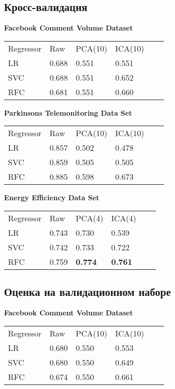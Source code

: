 \documentclass[runningheads]{llncs}
\begin{document}
\subsection{Кросс-валидация}
\textbf{Facebook Comment Volume Dataset}

\begin{table}[H]
\begin{tabular}{llllll}
Regressor & Raw     & PCA(10)   & ICA(10) \\
LR    & 0.688  & 0.551    & 0.551 \\
SVC   & 0.688  & 0.551    & 0.652 \\
RFC   & 0.681  & 0.551    & 0.660
\end{tabular}
\end{table}

\textbf{Parkinsons Telemonitoring Data Set}
\begin{table}[H]
\begin{tabular}{llllll}
Regressor  & Raw   & PCA(10) & ICA(10) \\
LR         & 0.857  & 0.502  & 0.478 \\
SVC        & 0.859 & 0.505   & 0.505 \\
RFC        & 0.885  & 0.598   & 0.673  
\end{tabular}
\end{table}

\textbf{Energy Efficiency Data Set}
\begin{table}[H]
\begin{tabular}{llllll}
Regressor                 & Raw  & PCA(4) & ICA(4) \\
LR    & 0.743 & 0.730  & 0.539 \\
SVC   & 0.742 & 0.733  & 0.722 \\
RFC   & 0.759 & \textbf{0.774}  & \textbf{0.761}  
\end{tabular}
\end{table}

\subsection{Оценка на валидационном наборе}
\textbf{Facebook Comment Volume Dataset}

\begin{table}[H]
\begin{tabular}{llllll}
Regressor & Raw     & PCA(10)   & ICA(10) \\
LR    & 0.680 & 0.550 & 0.553 \\
SVC   & 0.680 & 0.550 & 0.649 \\
RFC   & 0.674 & 0.550 & 0.661
\end{tabular}
\end{table}
\end{document}
